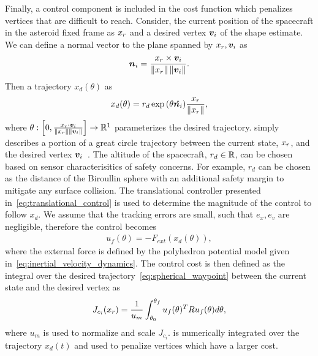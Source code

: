 Finally, a control component is included in the cost function which penalizes vertices that are difficult to reach.
Consider, the current position of the spacecraft in the asteroid fixed frame as \( x_r\) and a desired vertex \( \bm{v}_i \) of the shape estimate.
We can define a normal vector to the plane spanned by \( x_r, \bm{v}_i \) as
\begin{align}\label{eq:normal_to_plane}
    \bm{n}_i = \frac{x_r \times \bm{v}_i}{\left\| x_r \right\| \left\| \bm{v}_i \right\|}.
\end{align}
Then a trajectory \( x_d(\theta) \) as
\begin{align}\label{eq:spherical_waypoint}
    x_d(\theta) = r_d \exp{\ensuremath{\left( \theta \hat{\bm{n}_i} \right)} } \frac{x_r}{\left\| x_r \right\|},
\end{align}
where \( \theta : \left[ 0, \frac{x_r \cdot \bm{v}_i}{\left\| x_r \right\|\left\| \bm{v}_i \right\|} \right] \to \mathbb{R}^1\) parameterizes the desired trajectory.
 simply describes a portion of a great circle trajectory between the current state, \( x_r \), and the desired vertex \( \bm{v}_i \)~\cite{chen2016}.
The altitude of the spacecraft, \( r_d \in \mathbb{R} \), can be chosen based on sensor characterisitics of safety concerns.
For example, \( r_d \) can be chosen as the distance of the Biroullin sphere with an additional safety margin to mitigate any surface collision.
The translational controller presented in~\cref{eq:translational_control} is used to determine the magnitude of the control to follow \( x_d\).
We assume that the tracking errors are small, such that \( e_x, e_v \) are negligible, therefore the control becomes
\begin{align}\label{eq:tracking_control_cost}
    u_f(\theta) = -F_{ext}(x_d(\theta)), 
\end{align}
where the external force is defined by the polyhedron potential model given in~\cref{eq:inertial_velocity_dynamics}.
The control cost is then defined as the integral over the desired trajectory~\cref{eq:spherical_waypoint} between the current state and the desired vertex as
\begin{align}\label{eq:control_cost}
    J_{c_i}(x_r) = \frac{1}{u_m} \int_{\theta_0}^{\theta_f} u_f(\theta)^T R u_f(\theta) d\theta,
\end{align}
where \( u_m \) is used to normalize and scale \( J_{c_i} \).
 is numerically integrated over the trajectory \( x_d(t) \) and used to penalize vertices which have a larger cost.

